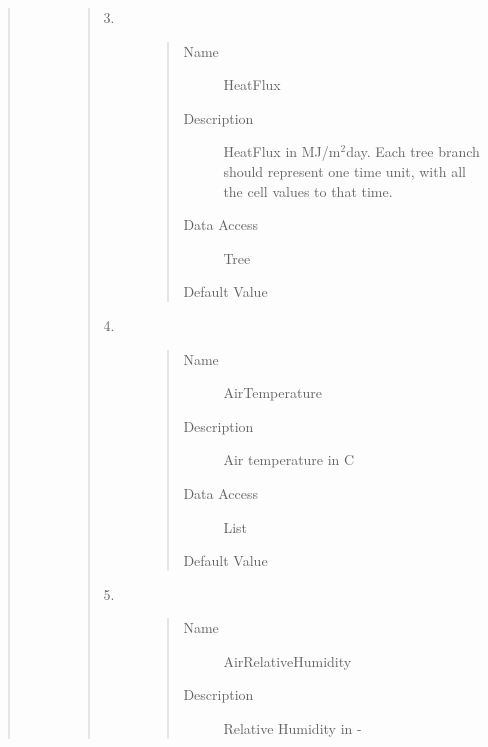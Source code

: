 \documentclass[letterpaper,10pt,english]{sphinxmanual}
\begin{document}
\begin{quote}
\begin{description}
\begin{quote}
\begin{description}
\begin{quote}
\begin{description}
\end{description}\end{quote}

\item[{3.}] \leavevmode\begin{quote}\begin{description}
\item[{Name}] \leavevmode
HeatFlux

\item[{Description}] \leavevmode
HeatFlux in MJ/m$^{\text{2}}$day.
Each tree branch should represent one time unit, with all the cell values to that time.

\item[{Data Access}] \leavevmode
Tree

\item[{Default Value}] \leavevmode
{}

\end{description}\end{quote}

\item[{4.}] \leavevmode\begin{quote}\begin{description}
\item[{Name}] \leavevmode
AirTemperature

\item[{Description}] \leavevmode
Air temperature in C

\item[{Data Access}] \leavevmode
List

\item[{Default Value}] \leavevmode
{}

\end{description}\end{quote}

\item[{5.}] \leavevmode\begin{quote}\begin{description}
\item[{Name}] \leavevmode
AirRelativeHumidity

\item[{Description}] \leavevmode
Relative Humidity in -


\end{description}
\end{quote}
\end{description}
\end{quote}
\end{description}
\end{quote}
\end{document}
